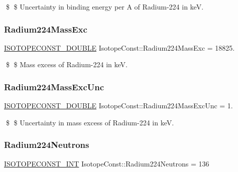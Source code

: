 \$ \$ Uncertainty in binding energy per A of Radium-\/224 in keV. \mbox{\label{group___isotope_const-_radium-_ra224_ga57e870e2f68de736b3563a5dfba918ad}} 
\subsubsection{\texorpdfstring{Radium224\+Mass\+Exc}{Radium224MassExc}}
{\footnotesize\ttfamily \mbox{\hyperlink{group___isotope_const-_macros_ga8f45a7272ce02c0b4c65c44636ed719a}{I\+S\+O\+T\+O\+P\+E\+C\+O\+N\+S\+T\+\_\+\+D\+O\+U\+B\+LE}} Isotope\+Const\+::\+Radium224\+Mass\+Exc = 18825.}

\$ \$ Mass excess of Radium-\/224 in keV. \mbox{\label{group___isotope_const-_radium-_ra224_ga7f70cd98031a2c4f5ca0da89a2c5840b}} 
\subsubsection{\texorpdfstring{Radium224\+Mass\+Exc\+Unc}{Radium224MassExcUnc}}
{\footnotesize\ttfamily \mbox{\hyperlink{group___isotope_const-_macros_ga8f45a7272ce02c0b4c65c44636ed719a}{I\+S\+O\+T\+O\+P\+E\+C\+O\+N\+S\+T\+\_\+\+D\+O\+U\+B\+LE}} Isotope\+Const\+::\+Radium224\+Mass\+Exc\+Unc = 1.}

\$ \$ Uncertainty in mass excess of Radium-\/224 in keV. \mbox{\label{group___isotope_const-_radium-_ra224_ga1117395d2f60073e2d8ad8de552a2b19}} 
\subsubsection{\texorpdfstring{Radium224\+Neutrons}{Radium224Neutrons}}
{\footnotesize\ttfamily \mbox{\hyperlink{group___isotope_const-_macros_ga5f18360b3e99483a35c32d789e62621c}{I\+S\+O\+T\+O\+P\+E\+C\+O\+N\+S\+T\+\_\+\+I\+NT}} Isotope\+Const\+::\+Radium224\+Neutrons = 136}

